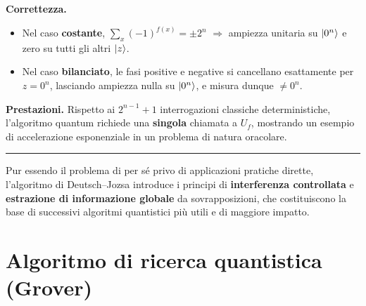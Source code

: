 \documentclass[a4paper,12pt]{report}
\theoremstyle{plain}
\begin{document}
\textbf{Correttezza.}
\begin{itemize}
    \item Nel caso \textbf{costante}, $\sum_x(-1)^{f(x)} = \pm 2^n$ $\Rightarrow$ ampiezza unitaria su $\ket{0^n}$ e zero su tutti gli altri $\ket{z}$.
    \item Nel caso \textbf{bilanciato}, le fasi positive e negative si cancellano esattamente per $z=0^n$, lasciando ampiezza nulla su $\ket{0^n}$, e misura dunque $\neq 0^n$.
\end{itemize}
\textbf{Prestazioni.}
Rispetto ai $2^{n-1}+1$ interrogazioni classiche deterministiche, l'algoritmo quantum richiede una \textbf{singola} chiamata a $U_f$, mostrando un esempio di accelerazione esponenziale in un problema di natura oracolare.
\vspace{0.5em}\hrule\vspace{0.5em}
\noindent Pur essendo il problema di per sé privo di applicazioni pratiche dirette, l'algoritmo di Deutsch--Jozsa introduce i principi di \textbf{interferenza controllata} e \textbf{estrazione di informazione globale} da sovrapposizioni, che costituiscono la base di successivi algoritmi quantistici più utili e di maggiore impatto.

\section{Algoritmo di ricerca quantistica (Grover)}
\end{document}
